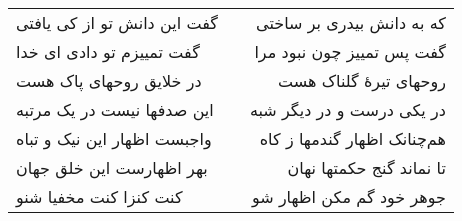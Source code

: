 \begin{center}
\begin{longtable}{l p{0.5cm} r}
\\
گفت این دانش تو از کی یافتی
&&
که به دانش بیدری بر ساختی
\\
گفت تمییزم تو دادی ای خدا
&&
گفت پس تمییز چون نبود مرا
\\
در خلایق روحهای پاک هست
&&
روحهای تیرهٔ گلناک هست
\\
این صدفها نیست در یک مرتبه
&&
در یکی درست و در دیگر شبه
\\
واجبست اظهار این نیک و تباه
&&
هم‌چنانک اظهار گندمها ز کاه
\\
بهر اظهارست این خلق جهان
&&
تا نماند گنج حکمتها نهان
\\
کنت کنزا کنت مخفیا شنو
&&
جوهر خود گم مکن اظهار شو
\\
\end{longtable}
\end{center}

